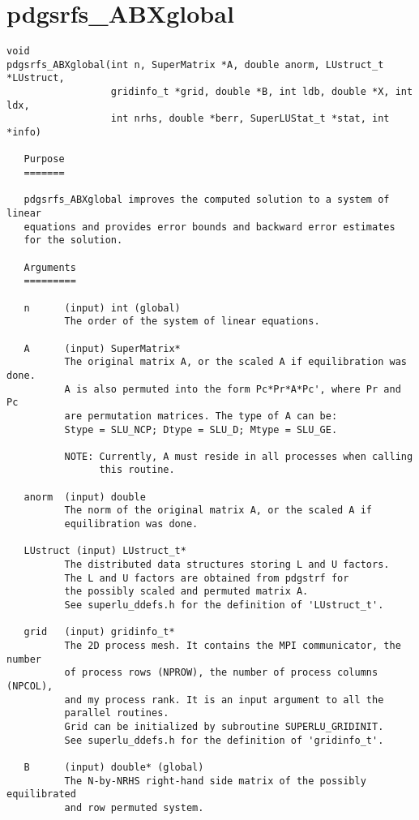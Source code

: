 \section{pdgsrfs\_ABXglobal}
\begin{verbatim}
void
pdgsrfs_ABXglobal(int n, SuperMatrix *A, double anorm, LUstruct_t *LUstruct,
                  gridinfo_t *grid, double *B, int ldb, double *X, int ldx,
                  int nrhs, double *berr, SuperLUStat_t *stat, int *info)

   Purpose
   =======
  
   pdgsrfs_ABXglobal improves the computed solution to a system of linear   
   equations and provides error bounds and backward error estimates
   for the solution. 
  
   Arguments
   =========
  
   n      (input) int (global)
          The order of the system of linear equations.
  
   A      (input) SuperMatrix*
          The original matrix A, or the scaled A if equilibration was done.
          A is also permuted into the form Pc*Pr*A*Pc', where Pr and Pc
          are permutation matrices. The type of A can be:
          Stype = SLU_NCP; Dtype = SLU_D; Mtype = SLU_GE.
  
          NOTE: Currently, A must reside in all processes when calling
                this routine.
  
   anorm  (input) double
          The norm of the original matrix A, or the scaled A if
          equilibration was done.
  
   LUstruct (input) LUstruct_t*
          The distributed data structures storing L and U factors.
          The L and U factors are obtained from pdgstrf for
          the possibly scaled and permuted matrix A.
          See superlu_ddefs.h for the definition of 'LUstruct_t'.
  
   grid   (input) gridinfo_t*
          The 2D process mesh. It contains the MPI communicator, the number
          of process rows (NPROW), the number of process columns (NPCOL),
          and my process rank. It is an input argument to all the
          parallel routines.
          Grid can be initialized by subroutine SUPERLU_GRIDINIT.
          See superlu_ddefs.h for the definition of 'gridinfo_t'.
  
   B      (input) double* (global)
          The N-by-NRHS right-hand side matrix of the possibly equilibrated
          and row permuted system.
         

\end{verbatim}
